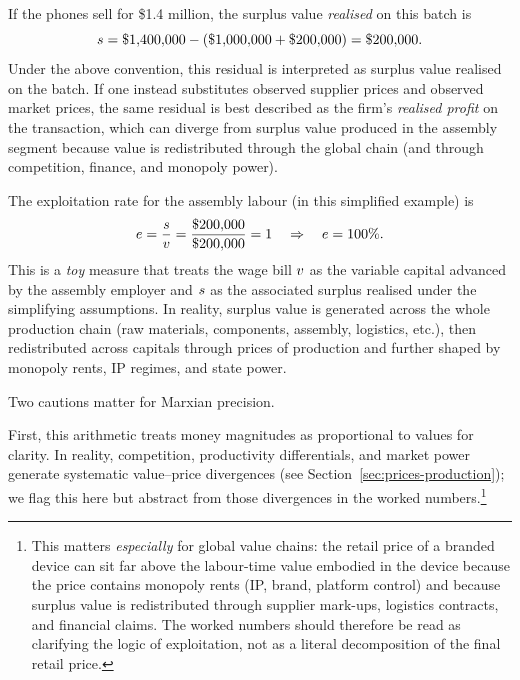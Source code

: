 If the phones sell for \$1.4 million, the surplus value \emph{realised} on this batch is
\begin{equation}
  s = \$1{,}400{,}000 - (\$1{,}000{,}000 + \$200{,}000) = \$200{,}000.
\end{equation}
Under the above convention, this residual is interpreted as surplus value realised on the batch.
If one instead substitutes observed supplier prices and observed market prices, the same residual is best described as
the firm's \emph{realised profit} on the transaction, which can diverge from surplus value produced in the assembly segment
because value is redistributed through the global chain (and through competition, finance, and monopoly power).

The exploitation rate for the assembly labour (in this simplified example) is
\begin{equation}
  e = \frac{s}{v}
  = \frac{\$200{,}000}{\$200{,}000} = 1 \quad\Rightarrow\quad e = 100\%.
\end{equation}
This is a \emph{toy} measure that treats the wage bill $v$ as the variable capital advanced by the assembly employer and
$s$ as the associated surplus realised under the simplifying assumptions. In reality, surplus value is generated across
the whole production chain (raw materials, components, assembly, logistics, etc.), then redistributed across capitals through
prices of production and further shaped by monopoly rents, IP regimes, and state power.

Two cautions matter for Marxian precision.

First, this arithmetic treats money magnitudes as proportional to values for clarity.
In reality, competition, productivity differentials, and market power generate systematic
value--price divergences (see Section~\ref{sec:prices-production}); we flag this here but
abstract from those divergences in the worked numbers.\footnote{This matters \emph{especially} for global value chains: the retail price of a branded device can sit far above the
labour-time value embodied in the device because the price contains monopoly rents (IP, brand, platform control) and because
surplus value is redistributed through supplier mark-ups, logistics contracts, and financial claims. The worked numbers should
therefore be read as clarifying the logic of exploitation, not as a literal decomposition of the final retail price.}

